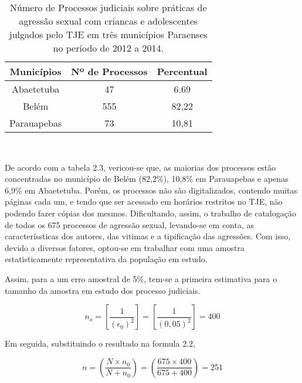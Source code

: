 \begin{table}[!htb]
    \centering
    {
    \caption{Número de Processos judiciais sobre práticas de agressão sexual com criancas e
adolescentes julgados pelo TJE em três municípios Paraenses no período de 2012 a 2014.}
    \label{amostras estratificada}
    \vspace{0.1cm}
\begin{tabular}{c|c|c}
  \hline\hline
  Municípios   & Nº de Processos &  Percentual \\
  \hline\hline
   Abaetetuba  & 47              & 6.69        \\
   Belém       & 555             & 82,22       \\
   Parauapebas & 73              & 10,81       \\
  \hline\hline
\end{tabular}}
\\
\hspace{-1.0cm}
\end{table}

De acordo com a tabela 2.3, vericou-se que, as maiorias dos processos estão
concentradas no município de Belém (82,2\%), 10,8\% em Parauapebas e apenas 6,9\%
em Abaetetuba. Porém, os processos não são digitalizados, contendo muitas páginas
cada um, e tendo que ser acessado em horários restritos no TJE, não podendo fazer
cópias dos mesmos. Dificultando, assim, o trabalho de catalogação de todos os 675
processos de agressão sexual, levando-se em conta, as caracteríssticas dos autores, das
vitimas e a tipificação das agressões. Com isso, devido a diversos fatores, optou-se
em trabalhar com uma amostra estatisticamente representativa da população em estudo.
\vskip0.3cm

Assim, para a um erro amostral de 5\%, tem-se a primeira estimativa para o tamanho da amostra em estudo dos processo judiciais.

\begin{equation}\label{nzero}
    n_{o}= \left[\frac{1}{\left(\epsilon_{0}\right)^2}\right] = \left[\frac{1}{\left(0,05
    \right)^2}\right]=400
\end{equation}

Em seguida, substituindo o resultado na formula 2.2,

\begin{equation}\label{nzero2}
    n=\left(\frac{N \times n_{0}}{N + n_{0}}\right)=
    \left(\frac{675 \times 400}{675 + 400}\right)=251
\end{equation}

